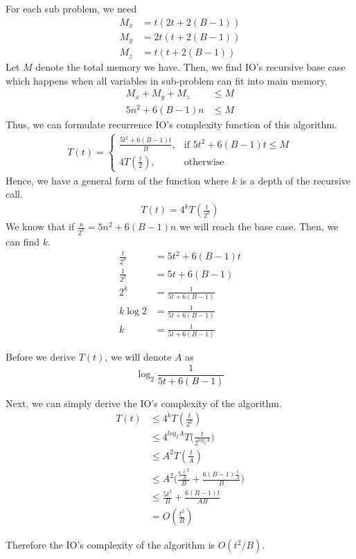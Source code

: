 For each sub problem, we need
\begin{align*}
	M_x &= t(2t + 2(B-1)) \\
	M_y &= 2t(t+2(B-1))\\
	M_z &= t(t+2(B-1))
\end{align*}
Let $M$ denote the total memory we have. Then, we find IO's recursive base case which happens when all variables in sub-problem can fit into main memory.
\begin{align*}
M_x + M_y + M_z &\leq M \\
5n^2 + 6(B-1)n &\leq M
\end{align*}
Thus, we can formulate recurrence IO's complexity function of this algorithm.
\begin{align*}
	T(t) = \begin{cases}
	    \frac{5t^2 + 6(B-1)t}{B},& \text{if } 5t^2 + 6(B-1)t \leq M\\
	    4T(\frac{t}{2}),              & \text{otherwise}
	\end{cases}
\end{align*}
Hence, we have a general form of the function where $k$ is a depth of the recursive call.
\begin{align*}
	T(t) = 4^{k}T(\frac{t}{2^{k}})
\end{align*}
We know that if $\frac{n}{2^{k}} = 5n^2 + 6(B-1)n$ we will reach the base case. Then, we can find $k$.
\begin{align*}
	\frac{t}{2^k} &= 5t^2 + 6(B-1)t \\
	\frac{1}{2^k	} &= 5t + 6(B-1) \\
	2^k &= \frac{1}{5t + 6(B-1)} \\
	k\log2 &= \frac{1}{5t + 6(B-1)} \\
	k &= \frac{1}{5t + 6(B-1)}
\end{align*}

Before we derive $T(t)$, we will denote $A$ as
$$\log_2 \frac{1}{5t + 6(B-1)}$$

Next, we can simply derive the IO's complexity of the algorithm.
\begin{align*}
	T(t) &\leq 4^{k}T(\frac{t}{2^{k}}) \\
	&\leq 4^{log_2 A}T\Big(\frac{t}{2^{log_2 A}}\Big) \\
	&\leq A^2T(\frac{t}{A}) \\
	&\leq A^2\Big( \frac{5\frac{t}{A}^2}{B} + \frac{6(B-1)\frac{t}{A}}{B} \Big) \\
	&\leq \frac{5t^2}{B} + \frac{6(B-1)t}{AB} \\
	&= O(\frac{t^2}{B})
\end{align*}

Therefore the IO's complexity of the algorithm is $O(t^2/B)$.